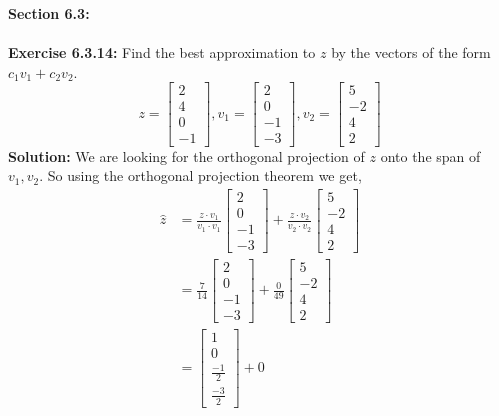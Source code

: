 \documentclass{amsart}
\begin{document}
\thispagestyle{fancy}





{\huge\textbf{Section 6.3:}}\\\\


\noindent\textbf{Exercise 6.3.14: }Find the best approximation to $z$ by the vectors of the form $c_1v_1+c_2v_2$.
\begin{equation*}
z = 
\begin{bmatrix}
2\\
4\\
0\\
-1
\end{bmatrix}, 
v_1 = 
\begin{bmatrix}
2\\
0\\
-1\\
-3
\end{bmatrix}, 
v_2 = 
\begin{bmatrix}
5\\
-2\\
4\\
2
\end{bmatrix}
\end{equation*}
\textbf{Solution: }We are looking for the orthogonal projection of $z$ onto the span of $v_1,v_2$. So using the orthogonal projection theorem we get,
\begin{align*}
\hat{z} &= \frac{z\cdot v_1}{v_1 \cdot v_1}
\begin{bmatrix}
2\\
0\\
-1\\
-3
\end{bmatrix}
+
\frac{z\cdot v_2}{v_2 \cdot v_2}
\begin{bmatrix}
5\\
-2\\
4\\
2
\end{bmatrix}\\
&=
 \frac{7}{14}
\begin{bmatrix}
2\\
0\\
-1\\
-3
\end{bmatrix}
+
\frac{0}{49}
\begin{bmatrix}
5\\
-2\\
4\\
2
\end{bmatrix}\\
&=
\begin{bmatrix}
1\\
0\\
\frac{-1}{2}\\
\frac{-3}{2}
\end{bmatrix}
+
0
\end{align*}
\end{document}
